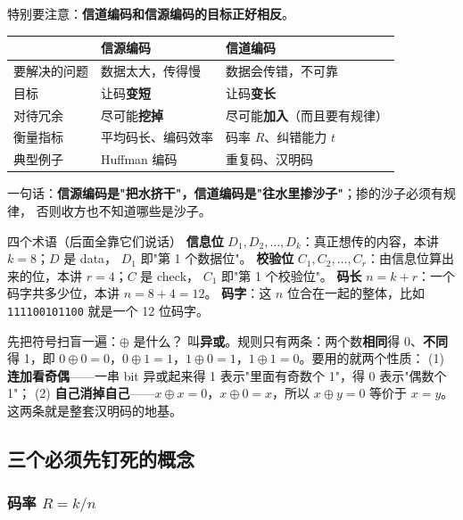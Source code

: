 特别要注意：\textbf{信道编码和信源编码的目标正好相反}。

\begin{center}\small
\setlength{\tabcolsep}{5pt}
\begin{tabular}{@{}lll@{}}
\toprule
 & 信源编码 & 信道编码\\
\midrule
要解决的问题 & 数据太大，传得慢 & 数据会传错，不可靠\\
目标 & 让码\textbf{变短} & 让码\textbf{变长}\\
对待冗余 & 尽可能\textbf{挖掉} & 尽可能\textbf{加入}（而且要有规律）\\
衡量指标 & 平均码长、编码效率 & 码率 $R$、纠错能力 $t$\\
典型例子 & Huffman 编码 & 重复码、汉明码\\
\bottomrule
\end{tabular}
\end{center}

一句话：\textbf{信源编码是"把水挤干"，信道编码是"往水里掺沙子"}；掺的沙子必须有规律，
否则收方也不知道哪些是沙子。

\begin{defbox}{四个术语（后面全靠它们说话）}
\textbf{信息位} $D_1,D_2,\dots,D_k$：真正想传的内容，本讲 $k=8$；$D$ 是 data，
$D_1$ 即"第 1 个数据位"。\quad
\textbf{校验位} $C_1,C_2,\dots,C_r$：由信息位算出来的位，本讲 $r=4$；$C$ 是 check，
$C_1$ 即"第 1 个校验位"。\quad
\textbf{码长} $n=k+r$：一个码字共多少位，本讲 $n=8+4=12$。\quad
\textbf{码字}：这 $n$ 位合在一起的整体，比如 \texttt{111100101100} 就是一个 12 位码字。
\end{defbox}

\begin{qa}{先把符号扫盲一遍：$\oplus$ 是什么？}
叫\textbf{异或}。规则只有两条：两个数\textbf{相同}得 0、\textbf{不同}得 1，即
$0\oplus0=0$，$0\oplus1=1$，$1\oplus0=1$，$1\oplus1=0$。要用的就两个性质：
(1) \textbf{连加看奇偶}——一串 bit 异或起来得 1 表示"里面有奇数个 1"，得 0 表示"偶数个 1"；
(2) \textbf{自己消掉自己}——$x\oplus x=0$，$x\oplus 0=x$，所以 $x\oplus y=0$ 等价于 $x=y$。
这两条就是整套汉明码的地基。
\end{qa}

\subsection{三个必须先钉死的概念}

\subsubsection{码率 $R=k/n$}

